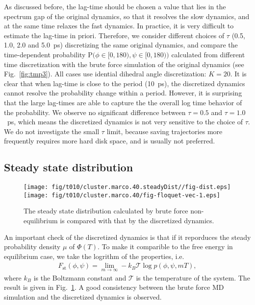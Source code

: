 \documentclass[aps, pre, preprint,unsortedaddress,a4paper,onecolumn]{revtex4}
\newcommand{\myphi}{\Phi}
\newcommand{\mymu}{\mu}
\newcommand{\prob}{\textrm{P}}
\begin{document}
As discussed before, the lag-time should be chosen a value that lies
in the spectrum gap of the original dynamics, so that it resolves the
slow dynamics, and at the same time relaxes the fast dynamics. In
practice, it is very difficult to estimate the lag-time in
priori. Therefore, we consider 
different choices of $\tau$ (0.5, 1.0, 2.0 and 5.0~ps)
discretizing the same original dynamics, and compare the
time-dependent probability $\prob\big(\phi\in[0,180), \psi\in
[0,180)\big)$ calculated from different time discretization with the brute force simulation
of the original dynamics
(see Fig.~\ref{fig:tmp3}).  All cases use idential dihedral angle discretization: $K=20$.
It is clear that when lag-time is close to the period (10~ps), the
discretized dynamics cannot resolve the probability change within a
period. However, it is surprising  that the large lag-times are able to capture the
the overall log time behavior of the probability.
We observe no significant difference between $\tau=0.5$ and
$\tau=1.0$~ps, which means the discretized dynamics is not very sensitive
to the choice of $\tau$. 
We do not investigate the small $\tau$ limit, because saving trajectories
more frequently requires more hard disk space, and is usually not preferred.

\subsection{Steady state distribution}

\begin{figure}
  \centering  
  \texttt{[image: fig/t010/cluster.marco.40.steadyDist//fig-dist.eps]}
  \texttt{[image: fig/t010/cluster.marco.40/fig-floquet-vec-1.eps]}
  \caption{The steady state distribution calculated by brute force non-equilibrium is compared with that by the discretized dynamics.}
  \label{fig:num-1}
\end{figure}

An important check of the discretized dynamics is that if it reporduces the steady probability
density $\mymu$ of $\myphi(T)$.
To make it comparible to
the free energy in equilibrium case, we take the logrithm of the properties, i.e.
\begin{align}
  \label{eq:num-tmp1}
  F_{\textrm{st}}(\phi,\psi) = \lim_{m\rightarrow\infty} -k_B\mathcal T \log p(\phi,\psi,mT),
\end{align}
where $k_B$ is the Boltzmann constant and $\mathcal T$ is the temperature of the system.
The result is given in Fig.~\ref{fig:num-1}. A good consistency between the brute force
MD simulation and the discretized dynamics is observed.
\end{document}
